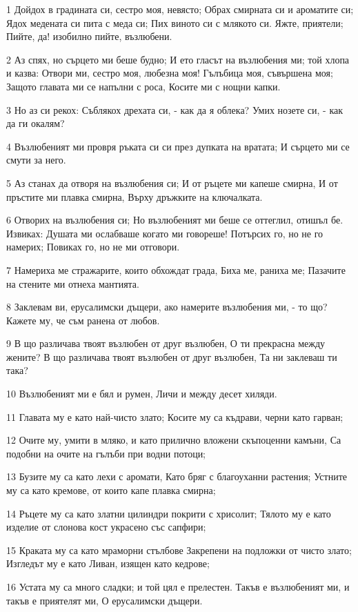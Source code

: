 \par 1 Дойдох в градината си, сестро моя, невясто; Обрах смирната си и ароматите си; Ядох медената си пита с меда си; Пих виното си с млякото си. Яжте, приятели; Пийте, да! изобилно пийте, възлюбени.
\par 2 Аз спях, но сърцето ми беше будно; И ето гласът на възлюбения ми; той хлопа и казва: Отвори ми, сестро моя, любезна моя! Гълъбица моя, съвършена моя; Защото главата ми се напълни с роса, Косите ми с нощни капки.
\par 3 Но аз си рекох: Съблякох дрехата си, - как да я облека? Умих нозете си, - как да ги окалям?
\par 4 Възлюбеният ми провря ръката си си през дупката на вратата; И сърцето ми се смути за него.
\par 5 Аз станах да отворя на възлюбения си; И от ръцете ми капеше смирна, И от пръстите ми плавка смирна, Върху дръжките на ключалката.
\par 6 Отворих на възлюбения си; Но възлюбеният ми беше се оттеглил, отишъл бе. Извиках: Душата ми ослабваше когато ми говореше! Потърсих го, но не го намерих; Повиках го, но не ми отговори.
\par 7 Намериха ме стражарите, които обхождат града, Биха ме, раниха ме; Пазачите на стените ми отнеха мантията.
\par 8 Заклевам ви, ерусалимски дъщери, ако намерите възлюбения ми, - то що? Кажете му, че съм ранена от любов.
\par 9 В що различава твоят възлюбен от друг възлюбен, О ти прекрасна между жените? В що различава твоят възлюбен от друг възлюбен, Та ни заклеваш ти така?
\par 10 Възлюбеният ми е бял и румен, Личи и между десет хиляди.
\par 11 Главата му е като най-чисто злато; Косите му са къдрави, черни като гарван;
\par 12 Очите му, умити в мляко, и като прилично вложени скъпоценни камъни, Са подобни на очите на гълъби при водни потоци;
\par 13 Бузите му са като лехи с аромати, Като бряг с благоуханни растения; Устните му са като кремове, от които капе плавка смирна;
\par 14 Ръцете му са като златни цилиндри покрити с хрисолит; Тялото му е като изделие от слонова кост украсено със сапфири;
\par 15 Краката му са като мраморни стълбове Закрепени на подложки от чисто злато; Изгледът му е като Ливан, изящен като кедрове;
\par 16 Устата му са много сладки; и той цял е прелестен. Такъв е възлюбеният ми, и такъв е приятелят ми, О ерусалимски дъщери.

